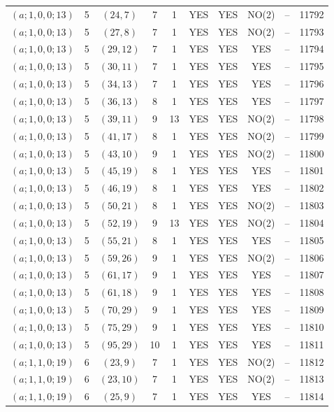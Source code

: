 \begin{longtable}{|c|c|c|c|c|c|c|c|c|c|}
$(a; 1, 0, 0; 13)$ & 5 & $(24, 7)$ & 7 & 1 & YES & YES & NO(2) & -- & 11792\\
$(a; 1, 0, 0; 13)$ & 5 & $(27, 8)$ & 7 & 1 & YES & YES & NO(2) & -- & 11793\\
$(a; 1, 0, 0; 13)$ & 5 & $(29, 12)$ & 7 & 1 & YES & YES & YES & -- & 11794\\
$(a; 1, 0, 0; 13)$ & 5 & $(30, 11)$ & 7 & 1 & YES & YES & YES & -- & 11795\\
$(a; 1, 0, 0; 13)$ & 5 & $(34, 13)$ & 7 & 1 & YES & YES & YES & -- & 11796\\
$(a; 1, 0, 0; 13)$ & 5 & $(36, 13)$ & 8 & 1 & YES & YES & YES & -- & 11797\\
$(a; 1, 0, 0; 13)$ & 5 & $(39, 11)$ & 9 & 13 & YES & YES & NO(2) & -- & 11798\\
$(a; 1, 0, 0; 13)$ & 5 & $(41, 17)$ & 8 & 1 & YES & YES & NO(2) & -- & 11799\\
$(a; 1, 0, 0; 13)$ & 5 & $(43, 10)$ & 9 & 1 & YES & YES & NO(2) & -- & 11800\\
$(a; 1, 0, 0; 13)$ & 5 & $(45, 19)$ & 8 & 1 & YES & YES & YES & -- & 11801\\
$(a; 1, 0, 0; 13)$ & 5 & $(46, 19)$ & 8 & 1 & YES & YES & YES & -- & 11802\\
$(a; 1, 0, 0; 13)$ & 5 & $(50, 21)$ & 8 & 1 & YES & YES & NO(2) & -- & 11803\\
$(a; 1, 0, 0; 13)$ & 5 & $(52, 19)$ & 9 & 13 & YES & YES & NO(2) & -- & 11804\\
$(a; 1, 0, 0; 13)$ & 5 & $(55, 21)$ & 8 & 1 & YES & YES & YES & -- & 11805\\
$(a; 1, 0, 0; 13)$ & 5 & $(59, 26)$ & 9 & 1 & YES & YES & NO(2) & -- & 11806\\
$(a; 1, 0, 0; 13)$ & 5 & $(61, 17)$ & 9 & 1 & YES & YES & YES & -- & 11807\\
$(a; 1, 0, 0; 13)$ & 5 & $(61, 18)$ & 9 & 1 & YES & YES & YES & -- & 11808\\
$(a; 1, 0, 0; 13)$ & 5 & $(70, 29)$ & 9 & 1 & YES & YES & YES & -- & 11809\\
$(a; 1, 0, 0; 13)$ & 5 & $(75, 29)$ & 9 & 1 & YES & YES & YES & -- & 11810\\
$(a; 1, 0, 0; 13)$ & 5 & $(95, 29)$ & 10 & 1 & YES & YES & YES & -- & 11811\\
$(a; 1, 1, 0; 19)$ & 6 & $(23, 9)$ & 7 & 1 & YES & YES & NO(2) & -- & 11812\\
$(a; 1, 1, 0; 19)$ & 6 & $(23, 10)$ & 7 & 1 & YES & YES & NO(2) & -- & 11813\\
$(a; 1, 1, 0; 19)$ & 6 & $(25, 9)$ & 7 & 1 & YES & YES & YES & -- & 11814\\

\end{longtable}
